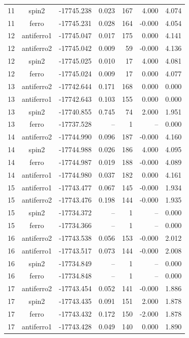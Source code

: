 \begin{longtable}{@{}ccrrrrr@{}}
11 & spin2 & -17745.238 & 0.023 & 167 & 4.000 & 4.074 \\
11 & ferro & -17745.231 & 0.028 & 164 & -0.000 & 4.054 \\
\rowcolor{gray!20} 12 & antiferro1 & -17745.047 & 0.017 & 175 & 0.000 & 4.141 \\
12 & antiferro2 & -17745.042 & 0.009 & 59 & -0.000 & 4.136 \\
12 & spin2 & -17745.025 & 0.010 & 17 & 4.000 & 4.081 \\
12 & ferro & -17745.024 & 0.009 & 17 & 0.000 & 4.077 \\
\rowcolor{gray!20} 13 & antiferro2 & -17742.644 & 0.171 & 168 & 0.000 & 0.000 \\
13 & antiferro1 & -17742.643 & 0.103 & 155 & 0.000 & 0.000 \\
13 & spin2 & -17740.855 & 0.745 & 74 & 2.000 & 1.951 \\
13 & ferro & -17737.528 & -- & 1 & -- & 0.000 \\
\rowcolor{gray!20} 14 & antiferro2 & -17744.990 & 0.096 & 187 & -0.000 & 4.160 \\
14 & spin2 & -17744.988 & 0.026 & 186 & 4.000 & 4.095 \\
14 & ferro & -17744.987 & 0.019 & 188 & -0.000 & 4.089 \\
14 & antiferro1 & -17744.980 & 0.037 & 182 & 0.000 & 4.161 \\
\rowcolor{gray!20} 15 & antiferro1 & -17743.477 & 0.067 & 145 & -0.000 & 1.934 \\
15 & antiferro2 & -17743.476 & 0.198 & 144 & -0.000 & 1.935 \\
15 & spin2 & -17734.372 & -- & 1 & -- & 0.000 \\
15 & ferro & -17734.366 & -- & 1 & -- & 0.000 \\
\rowcolor{gray!20} 16 & antiferro2 & -17743.538 & 0.056 & 153 & -0.000 & 2.012 \\
16 & antiferro1 & -17743.517 & 0.073 & 144 & -0.000 & 2.008 \\
16 & spin2 & -17734.849 & -- & 1 & -- & 0.000 \\
16 & ferro & -17734.848 & -- & 1 & -- & 0.000 \\
\rowcolor{gray!20} 17 & antiferro2 & -17743.454 & 0.052 & 141 & -0.000 & 1.886 \\
17 & spin2 & -17743.435 & 0.091 & 151 & 2.000 & 1.878 \\
17 & ferro & -17743.432 & 0.172 & 150 & -2.000 & 1.878 \\
17 & antiferro1 & -17743.428 & 0.049 & 140 & 0.000 & 1.890 \\

\end{longtable}

